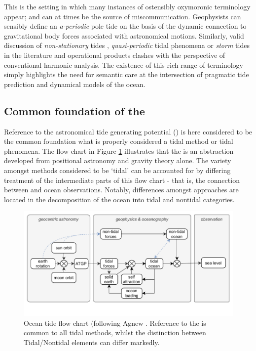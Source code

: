 This is the setting in which many instances of ostensibly oxymoronic terminology appear; and can at times be the source of miscommunication.  Geophysists can sensibly define an \emph{a-periodic} pole tide on the basis of the dynamic connection to gravitational body forces associated with astronomical motions. Similarly,  valid discussion of \emph{non-stationary} tides \cite{Ray:2011tj}, \emph{quasi-periodic} tidal phenomena \citep{Flinchem:2000kp} or \emph{storm} tides \cite{Horsburgh:2008gw} in the literature and operational products clashes with the perspective of conventional harmonic analysis.  The existence of this rich range of terminology simply highlights the need for semantic care at the intersection of pragmatic tide prediction and dynamical models of the ocean.\\


\subsection{Common foundation of the \ATGP{}}
Reference to the astronomical tide generating potential (\ATGP{}) is here considered to be the common foundation what is properly considered a tidal method or tidal phenomena.  The flow chart in Figure \ref{fig:TIDE_FORCE_FLOW} illustrates that the \ATGP{} is an abstraction developed from positional astronomy and gravity theory alone.   The variety amongst methods considered to be `tidal' can be accounted for by differing treatment of the intermediate parts of this flow chart - that is, the connection between \ATGP{} and ocean observations.  Notably, differences amongst approaches are located in the decomposition of the ocean into tidal and nontidal categories.\\

\begin{figure}[h]
\begin{center}
\includegraphics[width=\figwidthFull]{figures/diagrams/tidal_force_flowchart.pdf}
\caption{Ocean tide flow chart (following Agnew \citep{Agnew:2011ub}.  Reference to the \ATGP{} is common to all tidal methods, whilst the distinction between Tidal/Nontidal elements can differ markedly.}
\label{fig:TIDE_FORCE_FLOW}
\end{center}
\end{figure}


